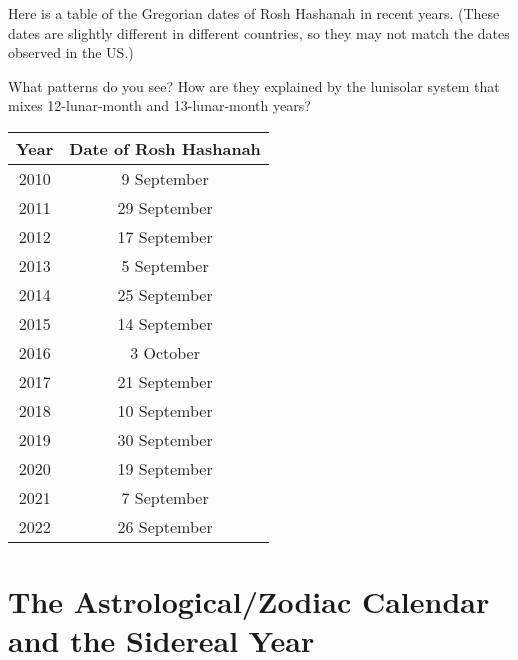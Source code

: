 \documentclass[11pt]{article}
\begin{document}
\begin{minipage}{0.5\textwidth}
	Here is a table of the Gregorian dates of Rosh Hashanah in recent years. (These dates are slightly different in different countries, so they may not match the dates observed in the US.) 
	
	\bigskip
	
	What patterns do you see? How are they explained by the lunisolar system that mixes 12-lunar-month and 13-lunar-month years?

\end{minipage}
\begin{minipage}{0.5\textwidth}
	\begin{center}
		\begin{tabular}{|c|c|}
			\hline
			Year & Date of Rosh Hashanah \\ \hline
			
			2010 & 9 September          \\ \hline
			2011 & 29 September            \\ \hline
			2012 & 17 September             \\ \hline
			2013 & 5 September             \\ \hline
			2014 & 25 September              \\ \hline
			2015 & 14 September             \\ \hline
			2016 & 3 October             \\ \hline
			2017 & 21 September              \\ \hline
			2018 & 10 September              \\ \hline
			2019 & 30 September              \\ \hline
			2020 & 19 September               \\ \hline
			2021 & 7 September               \\ \hline
			2022 & 26 September               \\ \hline
		\end{tabular}
	\end{center}
\end{minipage}


\vspace{1in}
\underline{\hspace{6in}}

\section{The Astrological/Zodiac Calendar and the Sidereal Year}
\end{document}

